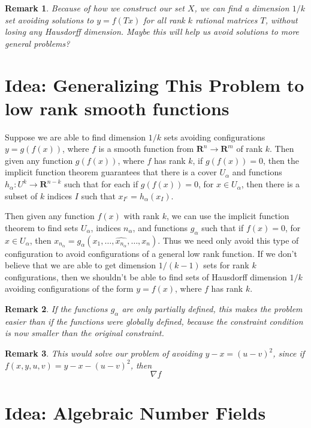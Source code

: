 \documentclass{report}
\theoremstyle{plain}
\theoremstyle{plain}
\newtheorem*{remark}{Remark}
\begin{document}
\begin{remark}
    Because of how we construct our set $X$, we can find a dimension $1/k$ set avoiding solutions to $y = f(Tx)$ for {\it all} rank $k$ rational matrices $T$, without losing any Hausdorff dimension. Maybe this will help us avoid solutions to more general problems?
\end{remark}

\section{Idea: Generalizing This Problem to low rank smooth functions}

Suppose we are able to find dimension $1/k$ sets avoiding configurations $y = g(f(x))$, where $f$ is a smooth function from $\mathbf{R}^n \to \mathbf{R}^m$ of rank $k$. Then given any function $g(f(x))$, where $f$ has rank $k$, if $g(f(x)) = 0$, then the implicit function theorem guarantees that there is a cover $U_\alpha$ and functions $h_\alpha: U^k \to \mathbf{R}^{n-k}$ such that for each if $g(f(x)) = 0$, for $x \in U_\alpha$, then there is a subset of $k$ indices $I$ such that $x_{I^c} = h_\alpha(x_I)$.

Then given any function $f(x)$ with rank $k$, we can use the implicit function theorem to find sets $U_\alpha$, indices $n_\alpha$, and functions $g_\alpha$ such that if $f(x) = 0$, for $x \in U_\alpha$, then $x_{n_\alpha} = g_\alpha(x_1, \dots, \widehat{x_{n_\alpha}}, \dots, x_n)$. Thus we need only avoid this type of configuration to avoid configurations of a general low rank function. If we don't believe that we are able to get dimension $1/(k-1)$ sets for rank $k$ configurations, then we shouldn't be able to find sets of Hausdorff dimension $1/k$ avoiding configurations of the form $y = f(x)$, where $f$ has rank $k$. 

\begin{remark}
    If the functions $g_\alpha$ are only partially defined, this makes the problem easier than if the functions were globally defined, because the constraint condition is now smaller than the original constraint.
\end{remark}

\begin{remark}
    This would solve our problem of avoiding $y - x = (u - v)^2$, since if $f(x,y,u,v) = y - x - (u - v)^2$, then
    \[ \nabla f \]
\end{remark}

\section{Idea: Algebraic Number Fields}
\end{document}
